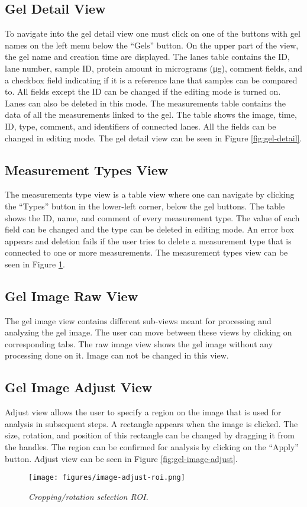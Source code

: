 \subsection{Gel Detail View}
To navigate into the gel detail view one must click on one of the buttons with gel names on the left menu below the “Gels” button. On the upper part of the view, the gel name and creation time are displayed.
The lanes table contains the ID, lane number, sample ID, protein amount in micrograms (μg), comment fields, and a checkbox field indicating if it is a reference lane that samples can be compared to.
All fields except the ID can be changed if the editing mode is turned on. Lanes can also be deleted in this mode.
The measurements table contains the data of all the measurements linked to the gel. The table shows the image, time, ID, type, comment, and identifiers of connected lanes. All the fields can be changed in editing mode. The gel detail view can be seen in Figure \ref{fig:gel-detail}.

\subsection{Measurement Types View}
The measurements type view is a table view where one can navigate by clicking the “Types” button in the lower-left corner, below the gel buttons. The table shows the ID, name, and comment of every measurement type. The value of each field can be changed and the type can be deleted in editing mode. An error box appears and deletion fails if the user tries to delete a measurement type that is connected to one or more measurements. The measurement types view can be seen in Figure \ref{fig:types-list}.

\subsection{Gel Image Raw View}

The gel image view contains different sub-views meant for processing and analyzing the gel image. The user can move between these views by clicking on corresponding tabs.
The raw image view shows the gel image without any processing done on it. Image can not be changed in this view.

\subsection{Gel Image Adjust View}

Adjust view allows the user to specify a region on the image that is used for analysis in subsequent steps. A rectangle appears when the image is clicked. The size, rotation, and position of this rectangle can be changed by dragging it from the handles. The region can be confirmed for analysis by clicking on the “Apply” button. Adjust view can be seen in Figure \ref{fig:gel-image-adjust}.
\begin{figure}[ht]
    \centering
    \texttt{[image: figures/image-adjust-roi.png]}
    \caption{\textit{Cropping/rotation selection ROI.}}
    \label{fig:types-list}
\end{figure}

